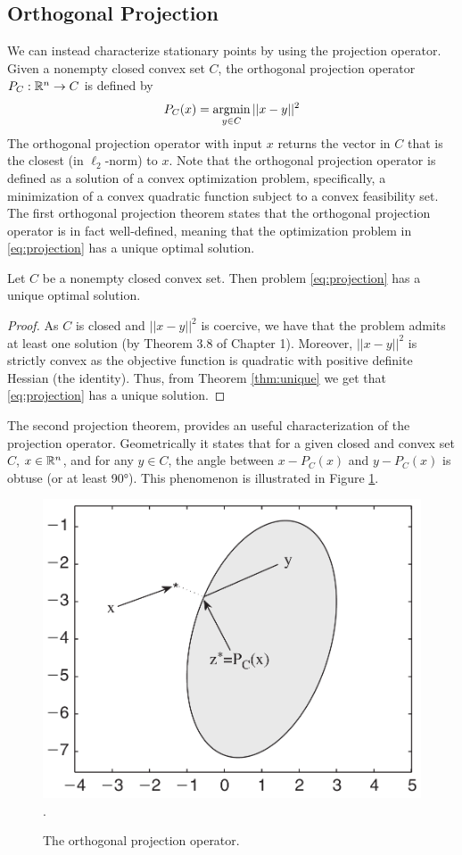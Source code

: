 \documentclass[10pt,a4paper]{article}
\begin{document}
\subsection{Orthogonal Projection}
We can instead characterize stationary points by using the projection operator.
Given a nonempty closed convex set $C$, the orthogonal projection operator $P_C:\mathbb{R}^n \to C$ is defined by 
\begin{equation}\label{eq:projection}
	P_C(x) = \operatorname*{argmin}_{y\in C} ||x-y||^2
\end{equation}
The orthogonal projection operator with input $x$ returns the vector in $C$ that is the closest (in $\ell_2$-norm)
to $x$. Note that the orthogonal projection operator is defined as a solution of a convex
optimization problem, specifically, a minimization of a convex quadratic function subject to a convex feasibility set. The first orthogonal projection theorem states that the orthogonal projection operator is in fact well-defined, meaning that the optimization problem in \eqref{eq:projection} has a unique optimal solution.
\begin{theorem}
	Let $C$ be a nonempty closed convex set. Then problem \eqref{eq:projection} has a unique optimal solution.
\end{theorem}
\begin{proof}
	As $C$ is closed and $||x-y||^2$ is coercive, we have that the problem admits at least one solution (by Theorem 3.8 of Chapter 1). Moreover, $||x-y||^2$ is strictly convex as the objective function is quadratic with
	positive definite Hessian (the identity). Thus, from Theorem \ref{thm:unique} we get that \eqref{eq:projection} has a unique solution.
\end{proof}
The second projection theorem, provides an useful characterization of the projection operator. Geometrically it states that for a given closed and convex set $C$, $x \in \mathbb{R}^n$, and for any $y\in C$, the angle between $x-P_C (x)$ and $y-P_C (x)$ is obtuse (or at least 90°).
This phenomenon is illustrated in Figure \ref{fig:second_projection}.
\begin{figure}
	\centering
	\includegraphics[width=0.5\linewidth]{second_projection}.
	\caption{The orthogonal projection operator.} \label{fig:second_projection}
\end{figure}
\end{document}
